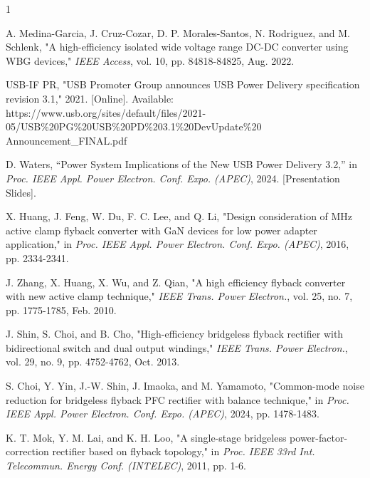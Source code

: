 \documentclass[lettersize,journal]{IEEEtran}
\begin{document}






\begin{thebibliography}{1}


A. Medina-Garcia, J. Cruz-Cozar, D. P. Morales-Santos, N. Rodriguez, and M. Schlenk, "A high-efficiency isolated wide voltage range DC-DC converter using WBG devices," \textit{IEEE Access}, vol. 10, pp. 84818-84825, Aug. 2022.

USB-IF PR, "USB Promoter Group announces USB Power Delivery specification revision 3.1," 2021. [Online]. Available: https://www.usb.org/sites/default/files/2021-05/USB\%20PG\%20USB\%20PD\%203.1\%20DevUpdate\%20\\Announcement\_FINAL.pdf

D. Waters, ``Power System Implications of the New USB Power Delivery 3.2,'' in \textit{Proc. IEEE Appl. Power Electron. Conf. Expo. (APEC)}, 2024. [Presentation Slides].

X. Huang, J. Feng, W. Du, F. C. Lee, and Q. Li, "Design consideration of MHz active clamp flyback converter with GaN devices for low power adapter application," in \textit{Proc. IEEE Appl. Power Electron. Conf. Expo. (APEC)}, 2016, pp. 2334-2341.

J. Zhang, X. Huang, X. Wu, and Z. Qian, "A high efficiency flyback converter with new active clamp technique," \textit{IEEE Trans. Power Electron.}, vol. 25, no. 7, pp. 1775-1785, Feb. 2010.


J. Shin, S. Choi, and B. Cho, "High-efficiency bridgeless flyback rectifier with bidirectional switch and dual output windings," \textit{IEEE Trans. Power Electron.}, vol. 29, no. 9, pp. 4752-4762, Oct. 2013.

S. Choi, Y. Yin, J.-W. Shin, J. Imaoka, and M. Yamamoto, "Common-mode noise reduction for bridgeless flyback PFC rectifier with balance technique," in \textit{Proc. IEEE Appl. Power Electron. Conf. Expo. (APEC)}, 2024, pp. 1478-1483.

K. T. Mok, Y. M. Lai, and K. H. Loo, "A single-stage bridgeless power-factor-correction rectifier based on flyback topology," in \textit{Proc. IEEE 33rd Int. Telecommun. Energy Conf. (INTELEC)}, 2011, pp. 1-6.


\end{thebibliography}
\end{document}

